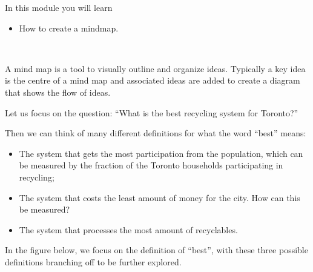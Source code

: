 	In this module you will learn
	\begin{itemize}
		\item How to create a mindmap.
	\end{itemize}

\hfill \\




A mind map is a tool to visually outline and organize ideas. Typically a key idea is the centre of a mind map and associated ideas are added to create a diagram that shows the flow of ideas. 

\begin{example}

Let us focus on the question: ``What is the best recycling system for Toronto?''

Then we can think of many different definitions for what the word ``best'' means:

\begin{itemize}
	\item The system that gets the most participation from the population, which can be measured by the fraction of the Toronto households participating in recycling;
	\item The system that costs the least amount of money for the city. How can this be measured?
	\item The system that processes the most amount of recyclables.
\end{itemize}

In the figure below, we focus on the definition of ``best'', with these three possible definitions branching off to be further explored.

\def\MindMapOne{
	\fill[color=Green!70!white] (0,0) rectangle (4,1) node[pos=.5] {\color{black}``Best'' recycling centre};
	\fill[color=BurntOrange] (6,2.5) rectangle (8,1.5) node[pos=.5] {\color{black}\begin{minipage}{40pt}\raggedright Most participation\end{minipage}};
	\fill[color=Goldenrod] (6,0) rectangle (8,1) node[pos=.5] {\color{black}\begin{minipage}{45pt}\raggedright Least cost to the city\end{minipage}};
	\fill[color=red!70!white] (6,-2) rectangle (8,-0.5) node[pos=.5] {\color{black}\begin{minipage}{50pt}\raggedright Processes the most recyclables\end{minipage}};
	\draw (4,0.75) -- (6,2);
	\draw (4,0.5) -- (6,0.5);
	\draw (4,0.25) -- (6,-1.25);
%
}


\end{example}
